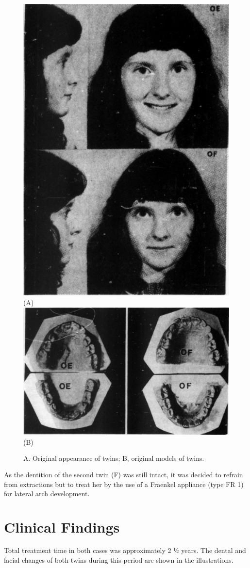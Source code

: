 \documentclass{article}
\begin{document}
\begin{figure}[H]
    \centering
    \includegraphics[width=0.5\linewidth]{fig01a.png}\\
    (A)
    \includegraphics[width=0.95\linewidth]{fig01b.png}\\
    (B)
    \caption{A. Original appearance of twins; B, original models of twins.}
\end{figure}

As the dentition of the second twin (F) was still intact, it was decided to refrain from extractions but to treat her by the use of a Fraenkel appliance (type FR 1) for lateral arch development.

\section*{Clinical Findings}

Total treatment time in both cases was approximately 2 ½ years. The dental and facial changes of both twins during this period are shown in the illustrations.
\end{document}
